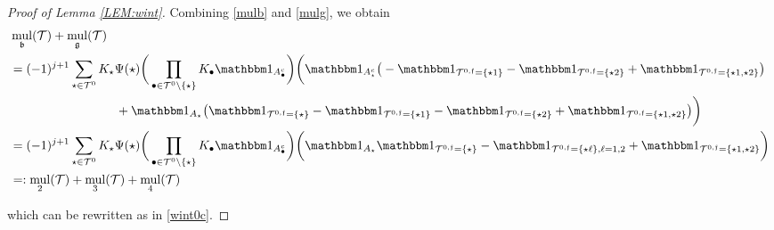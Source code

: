 \documentclass[%
11pt,  reqno]{amsart}
\newcommand{\5}{\textup{V}}
\newcommand{\noi}{\noindent}
\newcommand{\ind}{\mathbbm 1}
\theoremstyle{remark}
\newcommand{\bul}{\bullet}
\newcommand{\TT}{\mathcal{T}}
\newcommand{\bfrak}{\mathfrak{b}}
\newcommand{\gfrak}{\mathfrak{g}}
\renewcommand{\l}{\ell}
\newcommand{\ff}{\mathfrak{f}}
\DeclareMathOperator{\mul}{mul}
\numberwithin{equation}{section}
\numberwithin{theorem}{section}
\begin{document}
\begin{proof}[Proof of Lemma \ref{LEM:wint}]
Combining \eqref{mulb} and \eqref{mulg}, we obtain
\begin{align}
    & 
     \mul_\bfrak (\TT) + \mul_\gfrak(\TT) 
     \\
&
= 
(-1)^{j+1}
\sum_{\star\in \TT^0} K_\star \Psi(\star)
\bigg( \prod_{\bul \in \TT^0 \setminus \{\star\}} K_\bul \ind_{A^c_\bul} \bigg)
\bigg(
\ind_{A_\star^c}  
\big( 
- \ind_{\TT^{0,\ff} = \{\star1\}} - \ind_{\TT^{0,\ff} = \{\star2\}} + \ind_{\TT^{0,\ff} = \{\star1, \star2\}}
\big)
\\
&
\hspace{3cm}
+
\ind_{A_\star} 
\big( 
\ind_{ \TT^{0,\ff}  = \{\star\}} 
- \ind_{ \TT^{0,\ff}  = \{\star1\}}  
- \ind_{ \TT^{0,\ff}  = \{\star2\}} 
+\ind_{ \TT^{0,\ff}  = \{\star1, \star2\}}
\big)
\bigg)
\\
&
= 
(-1)^{j+1}
\sum_{\star\in \TT^0} K_\star \Psi(\star)
\bigg( \prod_{\bul \in \TT^0 \setminus \{\star\}} K_\bul \ind_{A^c_\bul} \bigg)
\bigg(
\ind_{A_\star}
\ind_{\TT^{0,\ff} = \{\star\}}
-
\ind_{\TT^{0,\ff}=\{\star\l\}, \l=1,2 }
+
\ind_{\TT^{0,\ff} = \{\star1,\star2\}}
\bigg)
\\
&
= : \mul_2(\TT) + \mul_3(\TT) + \mul_4(\TT)
\label{mul234}
\end{align}

\noi 
which can be rewritten as in \eqref{wint0c}.
\qedhere


	
\end{proof}


 


\end{document}
